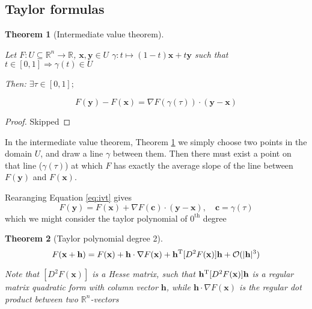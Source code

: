 \documentclass{article}
\theoremstyle{plain}
\newtheorem{theorem}{Theorem}
\begin{document}
\subsection{Taylor formulas}

\begin{theorem}[Intermediate value theorem]
    \label{th:ivt}

    Let $F: U \subseteq \mathbb R^n \rightarrow \mathbb R$, $\mathbf x, \mathbf y \in U$
    $\gamma: t \mapsto (1-t) \mathbf x + t \mathbf y$ such that $ t \in [0, 1] \Rightarrow \gamma(t) \in U$

    Then: $\exists \tau \in [0, 1];$

    \begin{equation}\label{eq:ivt}
        F(\mathbf y) - F(\mathbf x) = \nabla F(\gamma(\tau)) \cdot (\mathbf y - \mathbf x)        
    \end{equation}
    
\end{theorem}

\begin{proof}
    Skipped
\end{proof}

In the intermediate value theorem, Theorem \ref{th:ivt} we simply choose two points in the
domain $U$, and draw a line $\gamma$ between them. Then there must
exist a point on that line ($\gamma(\tau)$) at which $F$ has exactly the average slope of the line between 
$F(\mathbf y)$ and $ F(\mathbf x)$.

Rearanging Equation \ref{eq:ivt} gives 
$$F(\mathbf y) = F(\mathbf x) + \nabla F(\mathbf c) \cdot (\mathbf y - \mathbf x), \quad \mathbf c = \gamma(\tau)$$
which we might consider the taylor polynomial of $0^{\textrm{th}}$ degree

\begin{theorem}[Taylor polynomial degree 2]
    \label{th:taylor}
    \begin{equation}\label{eq:taylor}
        F(\mathbf x + \mathbf h) = F(\mathbf x) + \mathbf h \cdot \nabla F(\mathbf x) + \mathbf h^{\rm{T}} [D^2 F(\mathbf x)] \mathbf h + \mathcal O (|\mathbf h|^3)
    \end{equation}

    Note that $[D^2 F(\mathbf x)]$ is a Hesse matrix, such that $\mathbf h^{\rm{T}} [D^2 F(\mathbf x)] \mathbf h$ is a regular matrix quadratic
    form with column vector $\mathbf h$, while $\mathbf h \cdot \nabla F(\mathbf x)$ is the regular dot product between two $\mathbb R^n$-vectors
\end{theorem}
\end{document}
